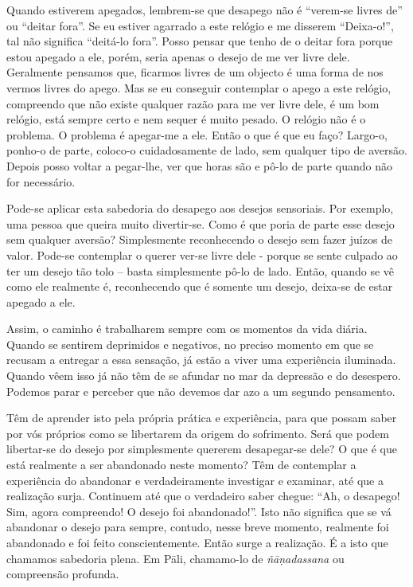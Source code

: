 Quando estiverem apegados, lembrem-se que desapego não é “verem-se livres de” ou
“deitar fora”. Se eu estiver agarrado a este relógio e me disserem “Deixa-o!”,
tal não significa “deitá-lo fora”. Posso pensar que tenho de o deitar fora
porque estou apegado a ele, porém, seria apenas o desejo de me ver livre dele.
Geralmente pensamos que, ficarmos livres de um objecto é uma forma de nos vermos
livres do apego. Mas se eu conseguir contemplar o apego a este relógio,
compreendo que não existe qualquer razão para me ver livre dele, é um bom
relógio, está sempre certo e nem sequer é muito pesado. O relógio não é o
problema. O problema é apegar-me a ele. Então o que é que eu faço? Largo-o,
ponho-o de parte, coloco-o cuidadosamente de lado, sem qualquer tipo de aversão.
Depois posso voltar a pegar-lhe, ver que horas são e pô-lo de parte quando não
for necessário.

Pode-se aplicar esta sabedoria do desapego aos desejos sensoriais. Por exemplo,
uma pessoa que queira muito divertir-se. Como é que poria de parte esse desejo
sem qualquer aversão? Simplesmente reconhecendo o desejo sem fazer juízos de
valor. Pode-se contemplar o querer ver-se livre dele - porque se sente culpado
ao ter um desejo tão tolo -- basta simplesmente pô-lo de lado. Então, quando se
vê como ele realmente é, reconhecendo que é somente um desejo, deixa-se de estar
apegado a ele.

Assim, o caminho é trabalharem sempre com os momentos da vida diária. Quando se
sentirem deprimidos e negativos, no preciso momento em que se recusam a entregar
a essa sensação, já estão a viver uma experiência iluminada. Quando vêem isso já
não têm de se afundar no mar da depressão e do desespero. Podemos parar e
perceber que não devemos dar azo a um segundo pensamento.

Têm de aprender isto pela própria prática e experiência, para que possam saber
por vós próprios como se libertarem da origem do sofrimento. Será que podem
libertar-se do desejo por simplesmente quererem desapegar-se dele? O que é que
está realmente a ser abandonado neste momento? Têm de contemplar a experiência
do abandonar e verdadeiramente investigar e examinar, até que a realização
surja. Continuem até que o verdadeiro saber chegue: “Ah, o desapego! Sim, agora
compreendo! O desejo foi abandonado!”. Isto não significa que se vá abandonar o
desejo para sempre, contudo, nesse breve momento, realmente foi abandonado e foi
feito conscientemente. Então surge a realização. É a isto que
chamamos sabedoria plena. Em Pāli, chamamo-lo de \emph{ñāṇadassana} ou
compreensão profunda.

